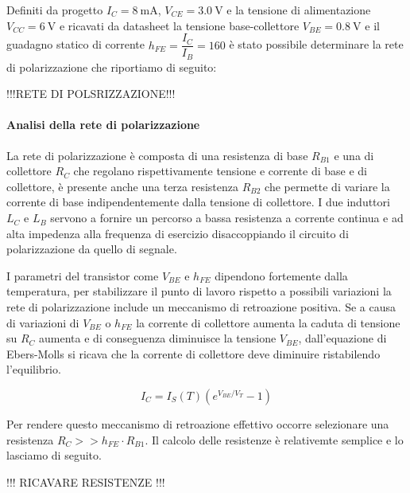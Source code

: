 \documentclass[12pt]{article}
\begin{document}
Definiti da progetto $I_{C}=\SI{8}{\milli\ampere}$, $V_{CE}=\SI{3.0}{\volt}$ e la tensione di alimentazione $V_{CC}=\SI{6}{\volt}$ e ricavati da datasheet la tensione base-collettore $V_{BE} = \SI{0.8}{\volt}$ e il guadagno statico di corrente $h_{FE} = \dfrac{I_C}{I_B}=160$ è stato possibile determinare la rete di polarizzazione che riportiamo di seguito:

!!!RETE DI POLSRIZZAZIONE!!!

\paragraph{Analisi della rete di polarizzazione}
La rete di polarizzazione è composta di una resistenza di base $R_{B1}$ e una di collettore $R_C$ che regolano rispettivamente tensione e corrente di base e di collettore, è presente anche una terza resistenza $R_{B2}$ che permette di variare la corrente di base indipendentemente dalla tensione di collettore. I due induttori $L_C$ e $L_B$ servono a fornire un percorso a bassa resistenza a corrente continua e ad alta impedenza alla frequenza di esercizio disaccoppiando il circuito di polarizzazione da quello di segnale.

I parametri del transistor come $V_{BE}$ e $h_{FE}$ dipendono fortemente dalla temperatura, per stabilizzare il punto di lavoro rispetto a possibili variazioni la rete di polarizzazione include un meccanismo di retroazione positiva. Se a causa di variazioni di $V_{BE}$ o $h_{FE}$ la corrente di collettore aumenta la caduta di tensione su $R_{C}$ aumenta e di conseguenza diminuisce la tensione $V_{BE}$, dall'equazione di Ebers-Molls si ricava che la corrente di collettore deve diminuire ristabilendo l'equilibrio.

\begin{equation}
    I_C=I_S(T)\left(e^{V_{BE}/V_T}-1\right)
\end{equation}

Per rendere questo meccanismo di retroazione effettivo occorre selezionare una resistenza $R_{C}>>h_{FE} \cdot R_{B1}$. Il calcolo delle resistenze è relativemte semplice e lo lasciamo di seguito.

!!! RICAVARE RESISTENZE !!!
\end{document}
